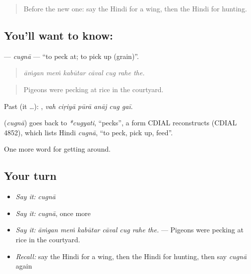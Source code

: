 \begin{quote}
Before the new one: say the Hindi for a wing, then the Hindi for hunting.
\end{quote}

\subsection*{You'll want to know: }
\textbf{} — \emph{cugnā} — \textquotedblleft{}to peck at; to pick up (grain)\textquotedblright{}.

\begin{quote}
      
\end{quote}

\begin{quote}
\emph{āṁgan meṁ kabūtar cāval cug rahe the.}
\end{quote}

\begin{quote}
Pigeons were pecking at rice in the courtyard.
\end{quote}

Past (it …):      , \emph{vah ciṛiyā pūrā anāj cug gaī}.

\begin{cousinweb}
\textbf{} (\emph{cugnā}) goes back to \emph{*cugyati}, \textquotedblleft{}pecks\textquotedblright{}, a form CDIAL reconstructs (CDIAL 4852), which lists Hindi \emph{cugnā}, \textquotedblleft{}to peck, pick up, feed\textquotedblright{}.
\end{cousinweb}

\begin{grammarlens}[title={What you've built}]
One more word for getting around.
\end{grammarlens}

\subsection*{Your turn}
\begin{itemize}
\raggedright
  \item \emph{Say it:} \emph{cugnā}
  \item \emph{Say it:} \emph{cugnā}, once more
  \item \emph{Say it:} \emph{āṁgan meṁ kabūtar cāval cug rahe the.} — Pigeons were pecking at rice in the courtyard.
  \item \emph{Recall:} say the Hindi for a wing, then the Hindi for hunting, then say \emph{cugnā} again
\end{itemize}

